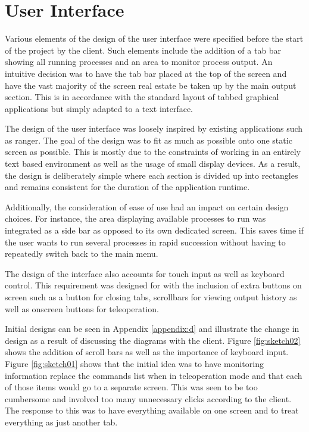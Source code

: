 \section{User Interface}
\label{ui_design}

Various elements of the design of the user interface were specified before the start of the project by the client. Such elements include the addition of a tab bar showing all running processes and an area to monitor process output. An intuitive decision was to have the tab bar placed at the top of the screen and have the vast majority of the screen real estate be taken up by the main output section. This is in accordance with the standard layout of tabbed graphical applications but simply adapted to a text interface.

The design of the user interface was loosely inspired by existing applications such as {\selectfont ranger}\cite{ranger}. The goal of the design was to fit as much as possible onto one static screen as possible. This is mostly due to the constraints of working in an entirely text based environment as well as the usage of small display devices. As a result, the design is deliberately simple where each section is divided up into rectangles and remains consistent for the duration of the application runtime.

Additionally, the consideration of ease of use had an impact on certain design choices. For instance, the area displaying available processes to run was integrated as a side bar as opposed to its own dedicated screen. This saves time if the user wants to run several processes in rapid succession without having to repeatedly switch back to the main menu.

The design of the interface also accounts for touch input as well as keyboard control. This requirement was designed for with the inclusion of extra buttons on screen such as a button for closing tabs, scrollbars for viewing output history as well as onscreen buttons for teleoperation.

Initial designs can be seen in Appendix \ref{appendix:d} and illustrate the change in design as a result of discussing the diagrams with the client. Figure \ref{fig:sketch02} shows the addition of scroll bars as well as the importance of keyboard input. Figure \ref{fig:sketch01} shows that the initial idea was to have monitoring information replace the commands list when in teleoperation mode and that each of those items would go to a separate screen. This was seen to be too cumbersome and involved too many unnecessary clicks according to the client. The response to this was to have everything available on one screen and to treat everything as just another tab.

